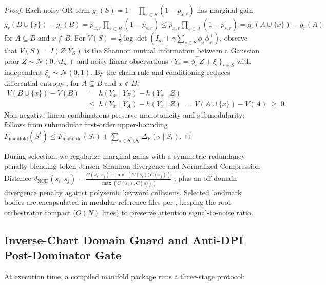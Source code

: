 \documentclass[11pt]{article}
\theoremstyle{definition}
\theoremstyle{plain}
\newcommand{\Ncal}{\mathcal{N}}
\begin{document}
\begin{proof}
Each noisy-OR term $g_r(S) = 1 - \prod_{s \in S}(1 - p_{s,r})$ has marginal gain $g_r(B \cup \{x\}) - g_r(B) = p_{x,r}\prod_{s \in B}(1 - p_{s,r}) \le p_{x,r}\prod_{s \in A}(1 - p_{s,r}) = g_r(A \cup \{x\}) - g_r(A)$ for $A \subseteq B$ and $x \notin B$. For $V(S) = \frac{1}{2}\log\det(I_m + \gamma \sum_{s \in S}\phi_s\phi_s^\top)$, observe that $V(S) = I(Z; Y_S)$ is the Shannon mutual information between a Gaussian prior $Z \sim \Ncal(0, \gamma I_m)$ and noisy linear observations $\{Y_s = \phi_s^\top Z + \xi_s\}_{s \in S}$ with independent $\xi_s \sim \Ncal(0, 1)$. By the chain rule and conditioning reduces differential entropy \citep{cover2006elements}, for $A \subseteq B$ and $x \notin B$,
\begin{align*}
  V(B \cup \{x\}) - V(B) &\;=\; h(Y_x \mid Y_B) - h(Y_x \mid Z) \\
  &\;\le\; h(Y_x \mid Y_A) - h(Y_x \mid Z) \;=\; V(A \cup \{x\}) - V(A) \;\ge\; 0.
\end{align*}
Non-negative linear combinations preserve monotonicity and submodularity;  follows from submodular first-order upper-bounding $F_{\mathrm{manifold}}(S^*) \le F_{\mathrm{manifold}}(S_t) + \sum_{s \in S^* \setminus S_t} \Delta_F(s \mid S_t)$.
\end{proof}

During selection, we regularize marginal gains with a symmetric redundancy penalty blending token Jensen--Shannon divergence and Normalized Compression Distance $d_{\mathrm{NCD}}(s_i, s_j) = \frac{C(s_i \cdot s_j) - \min(C(s_i), C(s_j))}{\max(C(s_i), C(s_j))}$ \citep{cilibrasi2005clustering,rissanen1978modeling}, plus an off-domain divergence penalty against polysemic keyword collisions. Selected landmark bodies are encapsulated in modular reference files per \citet{parnas1972criteria}, keeping the root orchestrator compact ($O(N)$ lines) to preserve attention signal-to-noise ratio.

\subsection{Inverse-Chart Domain Guard and Anti-DPI Post-Dominator Gate}
\label{subsec:runtime}

At execution time, a compiled manifold package runs a three-stage protocol:
\end{document}
